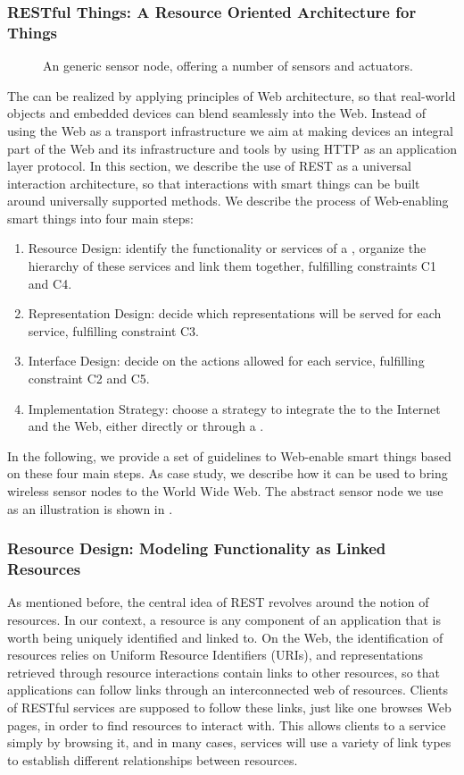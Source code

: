 \subsubsection{RESTful Things: A Resource Oriented Architecture for Things}\label{ROA-for-things}
\begin{figure}
\caption{An generic sensor node, offering a number of sensors and actuators.}
\label{fig:abstractSensor}
\end{figure}
The \WoT{} can be realized by applying principles of Web architecture, so that real-world objects and embedded devices can blend seamlessly into the Web. Instead of using the Web as a transport infrastructure we aim at making devices an integral part of the Web and its infrastructure and tools by using HTTP as an application layer protocol. In this section, we describe the use of REST as a universal interaction architecture, so that interactions with smart things can be built around universally supported methods. We describe the process of Web-enabling smart things into four main steps:
\begin{enumerate}
 \item Resource Design: identify the functionality or services of a \st{}, organize the hierarchy of these services and link them together, fulfilling constraints C1 and C4.
 \item Representation Design: decide which representations will be served for each service, fulfilling constraint C3.
 \item Interface Design: decide on the actions allowed for each service, fulfilling constraint C2 and C5.
 \item Implementation Strategy: choose a strategy to integrate the \sts{} to the Internet and the Web, either directly or through a \sg{}.
\end{enumerate}

In the following, we provide a set of guidelines to Web-enable smart things based on these four main steps. As case study, we describe how it can be used to bring wireless sensor nodes to the World Wide Web. The abstract sensor node we use as an illustration is shown in .


\subsubsection{Resource Design: Modeling Functionality as Linked Resources}
As mentioned before, the central idea of REST revolves around the notion of resources. In our context, a resource is any component of an application that is worth being uniquely identified and linked to. On the Web, the identification of resources relies on Uniform Resource Identifiers (URIs), and representations retrieved through resource interactions contain links to other resources, so that applications can follow links through an interconnected web of resources. Clients of RESTful services are supposed to follow these links, just like one browses Web pages, in order to find resources to interact with. This allows clients to  a service simply by browsing it, and in many cases, services will use a variety of link types to establish different relationships between resources.

